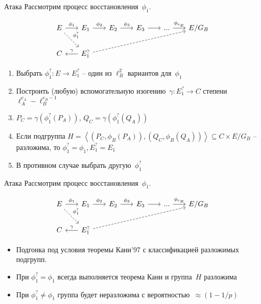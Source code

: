 \documentclass{beamer}
\begin{document}
\begin{frame}[fragile]{Атака}
	Рассмотрим процесс восстановления~$\phi_1$.%
	
	\[\begin{tikzcd}[column sep=scriptsize]
		E & {E_1} & {E_2} & {E_3} & {...} & {E/G_B} \\
		C & {E_1^?}
		\arrow["{\phi_1}", from=1-1, to=1-2]
		\arrow["{\phi_2}", from=1-2, to=1-3]
		\arrow["{\phi_3}", from=1-3, to=1-4]
		\arrow[from=1-4, to=1-5]
		\arrow["{\phi_{e_B}}", from=1-5, to=1-6]
		\arrow["\gamma"', from=2-2, to=2-1]
		\arrow["{\phi_1^?}", dashed, from=1-1, to=2-2]
		\arrow[dashed, from=2-2, to=1-6]
	\end{tikzcd}\]
	
	\vspace{1em}
	\begin{enumerate}
		\item Выбрать $\phi_1^{?}: E \rightarrow E_1^{?}$ -- один из $\ell_B^2$ вариантов для~$\phi_1$
		\item Построить (любую) вспомогательную изогению~$\gamma: E_1^{?} \rightarrow C$ степени~$\ell_{A}^{e_{A}} - \ell_{B}^{e_{B}-1}$
		\item $P_C = \gamma(\phi_1^{?}(P_A))$, $Q_C = \gamma(\phi_1^{?}(Q_A))$
		\item Если подгруппа $H = \left< (P_C, \phi_B(P_A)), (Q_C, \phi_B(Q_A))  \right> \subseteq C \times E/G_B$ -- разложима, то $\phi_1^{?} = \phi_1, E_1^{?} = E_1$
		\item В противном случае выбрать другую~$\phi_1^{?}$
	\end{enumerate}
\end{frame}


\begin{frame}[fragile]{Атака}
	Рассмотрим процесс восстановления~$\phi_1$.%
	
	\[\begin{tikzcd}[column sep=scriptsize]
		E & {E_1} & {E_2} & {E_3} & {...} & {E/G_B} \\
		C & {E_1^?}
		\arrow["{\phi_1}", from=1-1, to=1-2]
		\arrow["{\phi_2}", from=1-2, to=1-3]
		\arrow["{\phi_3}", from=1-3, to=1-4]
		\arrow[from=1-4, to=1-5]
		\arrow["{\phi_{e_B}}", from=1-5, to=1-6]
		\arrow["\gamma"', from=2-2, to=2-1]
		\arrow["{\phi_1^?}", dashed, from=1-1, to=2-2]
		\arrow[dashed, from=2-2, to=1-6]
	\end{tikzcd}\]
	
	\vspace{1em}
	\begin{itemize}
		\item Подгонка под условия теоремы Кани'97 с классификацией разложимых подгрупп.
		\item При $\phi_1^? = \phi_1$ всегда выполняется теорема Кани и группа~$H$ разложима
		\item При $\phi_1^? \neq \phi_1$ группа будет неразложима с вероятностью~$\approx (1-1/p)$  
	\end{itemize}
\end{frame}
\end{document}
